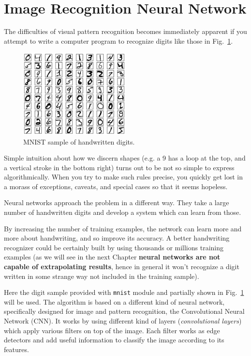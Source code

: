 \section{Image Recognition Neural Network}
\label{neural-net-to-recognize-handwritten-digits}

The difficulties of visual pattern recognition becomes immediately apparent if you attempt to write a computer program to recognize digits like those in Fig.~\ref{fig:mnist}.

\begin{figure}[b]
\centering
\includegraphics[width=0.5\textwidth]{figures/mnist_100_digits}
\caption{MNIST sample of handwritten digits.}
\label{fig:mnist}
\end{figure}

Simple intuition about how we discern shapes (e.g. a 9 has a loop at the top, and a vertical stroke in the bottom right) turns out to be not so simple to express algorithmically. When you try to make such rules precise, you quickly get lost in a morass of exceptions, caveats, and special cases so that it seems hopeless.

Neural networks approach the problem in a different way. They take a large number of handwritten digits and develop a system which can learn from those.

By increasing the number of training examples, the network can learn more and more about handwriting, and so improve its accuracy. A better handwriting recognizer could be certainly built by using thousands or millions training examples (as we will see in the next Chapter \textbf{neural networks are not capable of extrapolating results}, hence in general it won't recognize a digit written in some strange way not included in the training sample).

Here the digit sample provided with \texttt{mnist} module and partially shown in Fig.~\ref{fig:mnist} will be used. 
The algorithm is based on a different kind of neural network, specifically designed for image and pattern recognition, the Convolutional Neural Network (CNN). It works by using different kind of layers (\emph{convolutional layers}) which apply various filters on top of the image. Each filter works as edge detectors and add useful information to classify the image according to its features.

